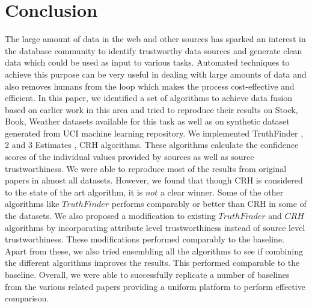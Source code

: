 \documentclass{acm_proc_article-sp}
\begin{document}
\section{Conclusion}
The large amount of data in the web and other sources has sparked an interest in the database community to identify trustworthy data sources and generate clean data which could be used as input to various tasks. Automated techniques to achieve this purpose can be very useful in dealing with large amounts of data and also removes humans from the loop  which makes the process cost-effective and efficient.  In this paper, we identified a set of algorithms to achieve data fusion based on earlier work in this area and tried to reproduce their results on Stock, Book, Weather datasets available for this task as well as on synthetic dataset generated from UCI machine learning repository. We implemented TruthFinder \cite{yin:truth}, 2 and 3 Estimates \cite{galland:corro} ,  CRH  \cite{li:resolving} algorithms. These algorithms calculate the confidence scores of the individual values provided by sources as well as source trustworthiness. We were able to reproduce most of the results from original papers in almost all datasets. However, we found that though CRH is considered to the state of the art algorithm, it is $not$ a clear winner. Some of the other algorithms like $TruthFinder$ performs comparably or better than CRH in some of the datasets. We also proposed a modification to existing $TruthFinder$ and $CRH$ algorithms by incorporating attribute level trustworthiness instead of source level trustworthiness. These modifications performed comparably to the baseline. Apart from these, we also tried ensembling all the algorithms to see if combining the different algorithms improves the results. This performed comparable to the baseline. Overall, we were able to successfully replicate a number of baselines from the various related papers providing a uniform platform to perform effective comparison.   



  

\balancecolumns
\end{document}

